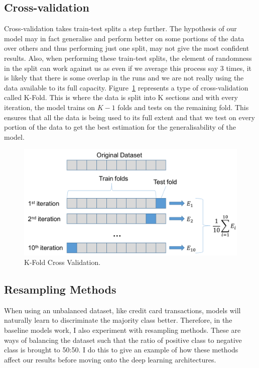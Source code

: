 \documentclass[12pt,a4paper,twoside]{report}
\begin{document}
\subsection{Cross-validation}

Cross-validation takes train-test splits a step further. The hypothesis of our model may in fact generalise and perform better on some portions of the data over others and thus performing just one split, may not give the most confident results. Also, when performing these train-test splits, the element of randomness in the split can work against us as even if we average this process say 3 times, it is likely that there is some overlap in the runs and we are not really using the data available to its full capacity. Figure~\ref{fig:k-fold-cross-val} represents a type of cross-validation called K-Fold. This is where the data is split into K sections and with every iteration, the model trains on $K-1$ folds and tests on the remaining fold. This ensures that all the data is being used to its full extent and that we test on every portion of the data to get the best estimation for the generalisability of the model.

\begin{figure}[!htbp]

\centering
\includegraphics[scale=0.8]{cross-val}
\caption{K-Fold Cross Validation.}
\label{fig:k-fold-cross-val}
\end{figure}

\subsection{Resampling Methods}

When using an unbalanced dataset, like credit card transactions, models will naturally learn to discriminate the majority class better\cite{Japkowicz00theclass}. Therefore, in the baseline models work, I also experiment with resampling methods.
These are ways of balancing the dataset such that the ratio of positive class to negative class is brought to 50:50. I do this to give an example of how these methods affect our results before moving onto the deep learning architectures. 
\end{document}
